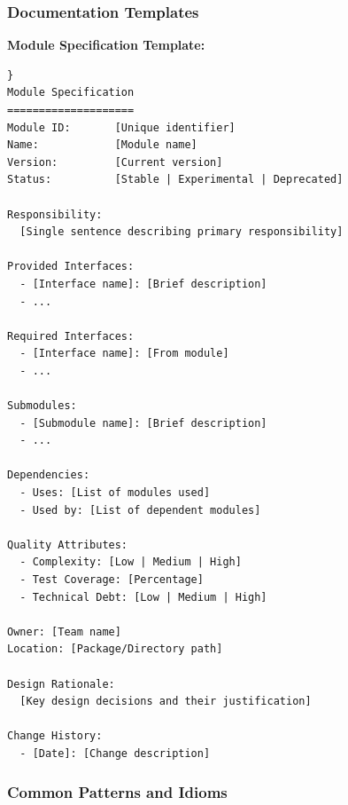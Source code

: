 \documentclass[11pt,letterpaper]{article}
\begin{document}
\subsubsection{Documentation Templates}

\textbf{Module Specification Template:}

\begin{verbatim}}
Module Specification
====================
Module ID:       [Unique identifier]
Name:            [Module name]
Version:         [Current version]
Status:          [Stable | Experimental | Deprecated]

Responsibility:
  [Single sentence describing primary responsibility]

Provided Interfaces:
  - [Interface name]: [Brief description]
  - ...

Required Interfaces:
  - [Interface name]: [From module]
  - ...

Submodules:
  - [Submodule name]: [Brief description]
  - ...

Dependencies:
  - Uses: [List of modules used]
  - Used by: [List of dependent modules]

Quality Attributes:
  - Complexity: [Low | Medium | High]
  - Test Coverage: [Percentage]
  - Technical Debt: [Low | Medium | High]

Owner: [Team name]
Location: [Package/Directory path]

Design Rationale:
  [Key design decisions and their justification]

Change History:
  - [Date]: [Change description]
\end{verbatim}

\subsubsection{Common Patterns and Idioms}
\end{document}
